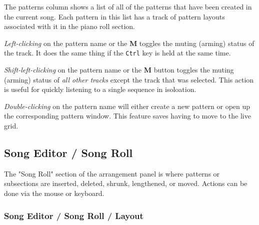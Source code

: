    The patterns column shows a list of all of the patterns that have been
   created in the current song.  Each pattern in this list has a track of
   pattern layouts associated with it in the piano roll section.

   \textsl{Left-clicking} on the pattern name or the \textbf{M} toggles the muting
   (arming) status of the track.
   It does the same thing if the \texttt{Ctrl} key is held at the same time.

   \textsl{Shift-left-clicking} on the pattern name
   or the \textbf{M} button toggles the muting
   (arming) status of \textsl{all other tracks} except the track that was
   selected.  This action is useful for quickly listening to a single sequence
   in isoloation.

   \textsl{Double-clicking} on the pattern name
   will either create a new pattern or open up the corresponding pattern
   window.
   This feature saves having to move to the live grid.

%

\subsection{Song Editor / Song Roll}
\label{subsec:song_editor_song_roll}

   The "Song Roll" section of the arrangement panel is where patterns or
   subsections are inserted, deleted, shrunk, lengthened, or moved.
   Actions can be done via the mouse or keyboard.

\subsubsection{Song Editor / Song Roll / Layout}
\label{subsubsec:song_editor_song_roll_layout}

